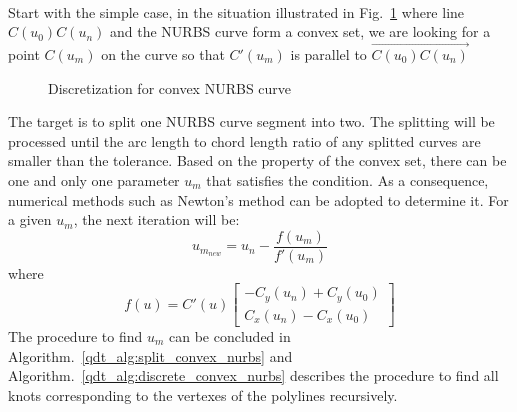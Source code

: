 \paragraph{}
Start with the simple case, in the situation illustrated in Fig.~\ref{qt_fig:iges_chord_split_convex_sum} where line $C(u_0)C(u_n)$ and the NURBS curve form a convex set, we are looking for a point $C(u_m)$ on the curve so that $C'(u_m)$ is parallel to $\overrightarrow{C(u_0)C(u_n)}$
    \begin{figure}[h!]
        \centering
        \caption{Discretization for convex NURBS curve}
        \label{qt_fig:iges_chord_split_convex_sum}
    \end{figure}
%
The target is to split one NURBS curve segment into two.
The splitting will be processed until the arc length to chord length ratio of any splitted curves are smaller than the tolerance.
Based on the property of the convex set, there can be one and only one parameter $u_m$ that satisfies the condition.
As a consequence, numerical methods such as Newton's method can be adopted to determine it.
For a given $u_m$, the next iteration will be:
    \begin{equation}
        u_{m_{new}} =  u_n - \frac{f(u_m)}{f'(u_m)}
    \end{equation}
%
where 
    \begin{equation}
        f(u) = C'(u) \begin{bmatrix}
            - C_y(u_n) + C_y(u_0) \\
            C_x(u_n) - C_x(u_0)
        \end{bmatrix}
    \end{equation}
%
The procedure to find $u_m$ can be concluded in Algorithm.~\ref{qdt_alg:split_convex_nurbs} and Algorithm.~\ref{qdt_alg:discrete_convex_nurbs} describes the procedure to find all knots corresponding to the vertexes of the polylines recursively.
